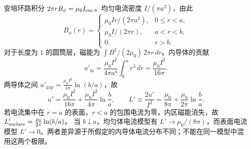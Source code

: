 安培环路积分 \(2\pi rB_\phi=\mu_0 I_{\rm enc}\)。均匀电流密度 \(I/(\pi a^2)\)，由此
\[B_\phi(r)=\begin{cases}\mu_0Ir/(2\pi a^2),&0\le r<a,\\\mu_0 I/(2\pi r),&a<r<b,\\0,&r>b.\end{cases}\]
对于长度为 \(1\) 的圆筒层，磁能为 \(\int B^2/(2\mu_0)\,2\pi r\,dr\)。内导体的贡献
\[u'_\mathrm{in}=\frac{\mu_0I^2}{4\pi a^4}\int_0^a r^3\,dr=\frac{\mu_0 I^2}{16\pi}.\]
两导体之间 \(u'_\mathrm{gap}=\frac{\mu_0I^2}{4\pi}\ln(b/a)\)，故
\[u'=\frac{\mu_0I^2}{16\pi}+\frac{\mu_0I^2}{4\pi}\ln\frac ba,\qquad
L'\equiv\frac{2u'}{I^2}=\frac{\mu_0}{8\pi}+\frac{\mu_0}{2\pi}\ln\frac ba.\]
若电流集中在 \(r=a\) 的表面，\(r<a\) 的包围电流为零，内区磁能消失，故 \(L'_{\rm surface}=\frac{\mu_0}{2\pi}\ln(b/a)\)。
当 \(b\downarrow a\)，均匀体电流模型有 \(L'\to\mu_0/(8\pi)\)，而表面电流模型 \(L'\to0\)。两者差异源于所假定的内导体电流分布不同；不能在同一模型中混用这两个极限。
